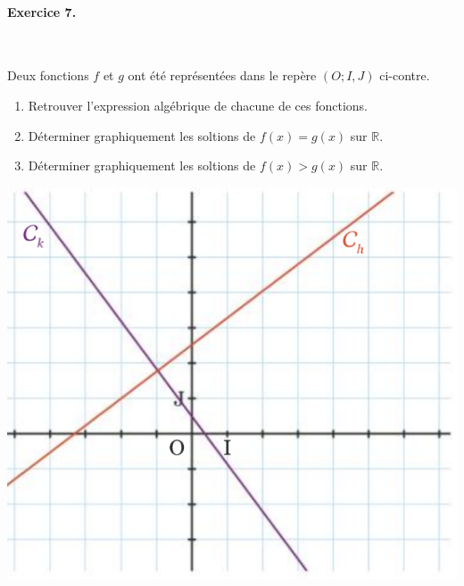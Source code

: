 \documentclass[11pt]{article}
\begin{document}
\paragraph{Exercice 7.}~\\
\begin{minipage}[]{.5\textwidth}
  Deux fonctions $f$ et $g$ ont été représentées dans le repère $(O; I, J)$
  ci-contre.
  \begin{enumerate}
    \item Retrouver l'expression algébrique de chacune de ces fonctions.
    \item Déterminer graphiquement les soltions de $f(x)=g(x)$ sur $\mathbb{R}$.
    \item Déterminer graphiquement les soltions de $f(x)>g(x)$ sur $\mathbb{R}$.
  \end{enumerate}
\end{minipage}
\begin{minipage}[]{.5\textwidth}
  \begin{center}
    \includegraphics[scale=.25]{exo4.png}
  \end{center}
\end{minipage}
\end{document}
